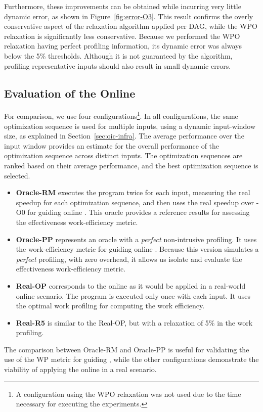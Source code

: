 Furthermore, these improvements can be obtained while incurring very little dynamic error, as shown in Figure~\ref{fig:error-O3}.
This result confirms the overly conservative aspect of the relaxation algorithm applied per DAG,
while the WPO relaxation is significantly less conservative.
Because we performed the WPO relaxation having perfect profiling information, its dynamic error was always below the 5\% thresholds.
Although it is not guaranteed by the algorithm, profiling representative inputs should also result in small dynamic errors.

\subsection{Evaluation of the Online {\IterComp}}

For comparison, we use four configurations\footnote{A configuration using the WPO relaxation was not used due to the time necessary for executing the experiments.}.
In all configurations, the same optimization sequence is used for multiple inputs, using a dynamic input-window size, as explained in Section~\ref{sec:oic-infra}.
The average performance over the input window provides an estimate for the overall performance of the optimization sequence across distinct inputs.
The optimization sequences are ranked based on their average performance, and the best optimization sequence is selected.
\begin{itemize}
\item \textbf{Oracle-RM} executes the program twice for each input, measuring the real speedup for each optimization sequence, and then uses the real speedup over {\flagstype -O0} for guiding online {\itercomp}. This oracle provides a reference results for assessing the effectiveness work-efficiency metric.
\item \textbf{Oracle-PP} represents an oracle with a \textit{perfect} non-intrusive profiling.
  It uses the work-efficiency metric for guiding online {\itercomp}.
  Because this version simulates a \textit{perfect} profiling, with zero overhead,
  it allows us isolate and evaluate the effectiveness work-efficiency metric.
\item \textbf{Real-OP} corresponds to the online {\itercomp} as it would be applied in a real-world online scenario.
  The program is executed only once with each input.
  It uses the optimal work profiling for computing the work efficiency.
\item \textbf{Real-R5} is similar to the {Real-OP}, but with a relaxation of 5\% in the work profiling.
\end{itemize}
The comparison between Oracle-RM and Oracle-PP is useful for validating the use of the WP metric for guiding {\itercomp}, while the other configurations demonstrate the viability of applying the online {\itercomp} in a real scenario.

